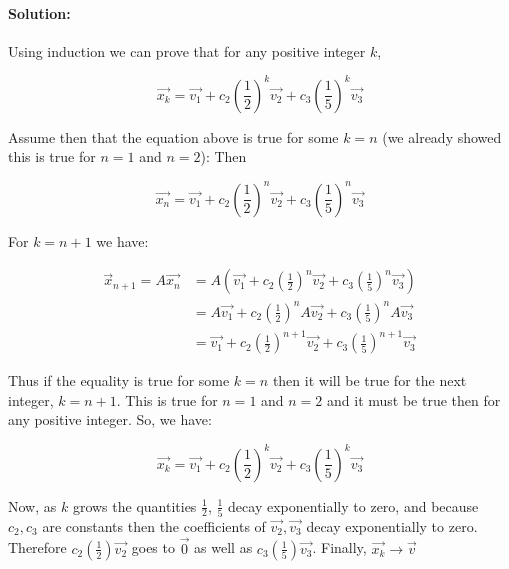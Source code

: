 \documentclass[12pt, letterpaper]{article}
\theoremstyle{statement}
\theoremstyle{statement}
\newenvironment{Solution}{\noindent\ignorespaces\paragraph{Solution:}}{\hfill \ding{122}\par\noindent}
\begin{document}
\begin{Solution}
    Using induction we can prove that for any positive integer $k$, 
    
    $$
    \vec{x_k} = \vec{v_1} + c_2\left(\frac{1}{2}\right)^k\vec{v_2} + c_3\left(\frac{1}{5}\right)^k\vec{v_3}
    $$
    
    Assume then that the equation above is true for some $k=n$ (we already showed this is true for $n=1$ and $n=2$): Then
    
    $$
    \vec{x_n} = \vec{v_1} + c_2\left(\frac{1}{2}\right)^n\vec{v_2} + c_3\left(\frac{1}{5}\right)^n\vec{v_3}
    $$
    
    For $k=n+1$ we have:
    
    \begin{align*}
        \vec{x}_{n+1} = A\vec{x_n} &= A(\vec{v_1} + c_2\left(\frac{1}{2}\right)^n\vec{v_2} + c_3\left(\frac{1}{5}\right)^n\vec{v_3}) \\
        &= A\vec{v_1} + c_2\left(\frac{1}{2}\right)^nA\vec{v_2} + c_3\left(\frac{1}{5}\right)^nA\vec{v_3} \\
        &= \vec{v_1} + c_2\left(\frac{1}{2}\right)^{n+1}\vec{v_2} + c_3\left(\frac{1}{5}\right)^{n+1}\vec{v_3}
    \end{align*} 
    
    Thus if the equality is true for some $k=n$ then it will be true for the next integer, $k=n+1$. This is true for $n=1$ and $n=2$ and it must be true then for any positive integer. So, we have:
    
    $$
    \vec{x_k} = \vec{v_1} + c_2\left(\frac{1}{2}\right)^k\vec{v_2} + c_3\left(\frac{1}{5}\right)^k\vec{v_3}
    $$
    
    Now, as $k$ grows the quantities $\frac{1}{2}$, $\frac{1}{5}$ decay exponentially to zero, and because $c_2, c_3$ are constants then the coefficients of $\vec{v_2}, \vec{v_3}$ decay exponentially to zero. Therefore $c_2\left(\frac{1}{2}\right)\vec{v_2}$ goes to $\vec{0}$ as well as $c_3\left(\frac{1}{5}\right)\vec{v_3}$. Finally, $\vec{x_k} \longrightarrow \vec{v}$
    \end{Solution}
\end{document}
